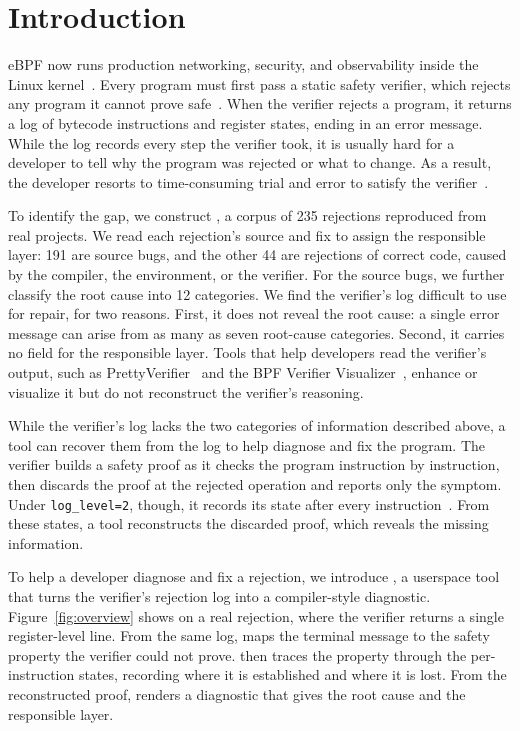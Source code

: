 \section{Introduction}
\label{sec:introduction}

eBPF now runs production networking, security, and observability inside the Linux kernel~\cite{gbadamosi2024ebpf}. Every program must first pass a static safety verifier, which rejects any program it cannot prove safe~\cite{gershuni2019simple}. When the verifier rejects a program, it returns a log of bytecode instructions and register states, ending in an error message. While the log records every step the verifier took, it is usually hard for a developer to tell why the program was rejected or what to change. As a result, the developer resorts to time-consuming trial and error to satisfy the verifier~\cite{deokar2024empirical}.

To identify the gap, we construct \empiricalset, a corpus of 235 rejections reproduced from real projects. We read each rejection's source and fix to assign the responsible layer: 191 are source bugs, and the other 44 are rejections of correct code, caused by the compiler, the environment, or the verifier. For the source bugs, we further classify the root cause into 12 categories. We find the verifier's log difficult to use for repair, for two reasons. First, it does not reveal the root cause: a single error message can arise from as many as seven root-cause categories. Second, it carries no field for the responsible layer. Tools that help developers read the verifier's output, such as PrettyVerifier~\cite{rizza2025design} and the BPF Verifier Visualizer~\cite{bpfvv}, enhance or visualize it but do not reconstruct the verifier's reasoning.

While the verifier's log lacks the two categories of information described above, a tool can recover them from the log to help diagnose and fix the program. The verifier builds a safety proof as it checks the program instruction by instruction, then discards the proof at the rejected operation and reports only the symptom. Under \texttt{log\_level=2}, though, it records its state after every instruction~\cite{linuxkernel-bpf-verifier,vishwanathan2022sound}. From these states, a tool reconstructs the discarded proof, which reveals the missing information.

To help a developer diagnose and fix a rejection, we introduce \sys, a userspace tool that turns the verifier's rejection log into a compiler-style diagnostic. Figure~\ref{fig:overview} shows \sys on a real rejection, where the verifier returns a single register-level line. From the same log, \sys maps the terminal message to the safety property the verifier could not prove. \sys then traces the property through the per-instruction states, recording where it is established and where it is lost. From the reconstructed proof, \sys renders a diagnostic that gives the root cause and the responsible layer.

